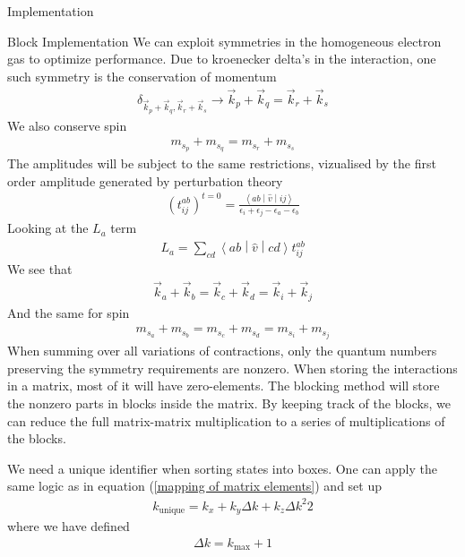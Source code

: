 \documentclass[twoside,english]{uiofysmaster}
\begin{document}
\begin{chapter}{Implementation}
	\begin{section}{Block Implementation}
		We can exploit symmetries in the homogeneous electron gas to optimize performance. Due to kroenecker delta's in the interaction, one such symmetry is the conservation of momentum
		\begin{align}
			\delta_{\vec k_p + \vec k_q, \vec k_r + \vec k_s} \rightarrow \vec k_p + \vec k_q = \vec k_r + \vec k_s
		\end{align}
		We also conserve spin 
		\begin{align}
			m_{s_p} + m_{s_q} = m_{s_r} + m_{s_s}
		\end{align}
		The amplitudes will be subject to the same restrictions, vizualised by the first order amplitude generated by perturbation theory
		\begin{align}
			(t_{ij}^{ab})^{t=0} = \frac{\left<ab\middle|\hat v\middle|ij\right>}{\epsilon_i + \epsilon_j - \epsilon_a - \epsilon_b}
		\end{align}
		Looking at the $L_a$ term
		\begin{align}
			L_a = \sum_{cd} \left<ab\middle|\hat v\middle|cd\right> t_{ij}^{ab}
		\end{align}
		We see that 
		\begin{align}
			\vec k_a + \vec k_b = \vec k_c + \vec k_d = \vec k_i + \vec k_j
		\end{align}
		And the same for spin
		\begin{align}
			m_{s_a} + m_{s_b} = m_{s_c} + m_{s_d} = m_{s_i} + m_{s_j} 
		\end{align}
		When summing over all variations of contractions, only the quantum numbers preserving the symmetry requirements are nonzero. When storing the interactions in a matrix, most of it will have zero-elements. The blocking method will store the nonzero parts in blocks inside the matrix. By keeping track of the blocks, we can reduce the full matrix-matrix multiplication to a series of multiplications of the blocks. 

		We need a unique identifier when sorting states into boxes. One can apply the same logic as in equation (\ref{mapping of matrix elements}) and set up
		\begin{align}
			k_{\text{unique}} = k_x + k_y \Delta k + k_z \Delta k^2 2
		\end{align}
		where we have defined 
		\begin{align}
			\Delta k = k_{\text{max}} + 1 
		\end{align}
		


	\end{section}
\end{chapter}
\end{document}
